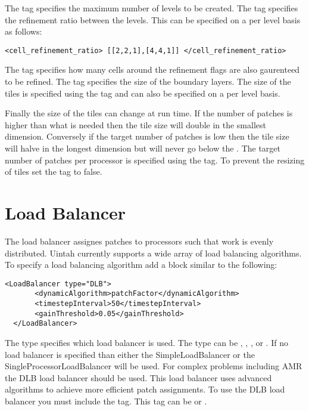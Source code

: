 The  tag specifies the maximum number of levels
to be created.  The  tag specifies the 
refinement ratio between the levels.  This can be specified on a per 
level basis as follows:

\begin{Verbatim}[fontsize=\footnotesize]
    <cell_refinement_ratio> [[2,2,1],[4,4,1]] </cell_refinement_ratio>
\end{Verbatim}

The  tag specifies how many cells around
the refinement flags are also gaurenteed to be refined.  The
 tag specifies the size of the boundary layers. 
The size of the tiles is specified using the  tag
and can also be specified on a per level basis.

Finally the size of the tiles can change at run time.  If the number
of patches is higher than what is needed then the tile size will double in
the smallest dimension.  Conversely if the target number of patches is low
then the tile size will halve in the longest dimension but will never go
below the .  The target number of patches per processor is 
specified using the  tag. To prevent the 
resizing of tiles set the tag  to false. 

%
\section{Load Balancer}

The load balancer assignes patches to processors such that work is 
evenly distributed.  Uintah currently supports a wide array of 
load balancing algorithms.  To specify a load balancing algorithm 
add a block similar to the following:

\begin{Verbatim}[fontsize=\footnotesize]
  <LoadBalancer type="DLB">
       <dynamicAlgorithm>patchFactor</dynamicAlgorithm>
       <timestepInterval>50</timestepInterval>
       <gainThreshold>0.05</gainThreshold>
  </LoadBalancer>
\end{Verbatim}

The type specifies which load balancer is used.  The type can be , 
, , or .  
If no load balancer is specified than either the SimpleLoadBalancer 
or the SingleProcessorLoadBalancer will be used.  For complex problems including 
AMR the DLB load  balancer should be used.  This load balancer uses advanced 
algorithms to achieve more efficient patch assignments.  To use the DLB load 
balancer you must include the   tag. This tag can be 
 or .  

